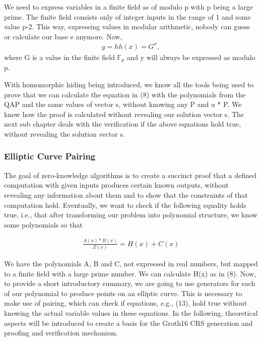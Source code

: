 We need to express variables in a finite field as of modulo p with p being a large prime. The finite field consists only of integer inputs in the range of 1 and some value p-2. This way, expressing values in modular arithmetic, nobody can guess or calculate our base e anymore. Now,
\begin{align}
    y = hh(x) = G^x,
\end{align}
where G is a value in the finite field \begin{math}\mathbb{F}_p\end{math} and y will always be expressed as modulo p.

With homomorphic hiding being introduced, we know all the tools being used to prove that we can calculate the equation in (8) with the polynomials from the QAP and the same values of vector s, without knowing any P and u * P. We know how the proof is calculated without revealing our solution vector s. The next sub chapter deals with the verification if the above equations hold true, without revealing the solution vector s.

\subsubsection{Elliptic Curve Pairing}

The goal of zero-knowledge algorithms is to create a succinct proof that a defined computation with given inputs produces certain known outputs, without revealing any information about them and to show that the constraints of that computation hold. Eventually, we want to check if the following equality holds true, i.e., that after transforming our problem into polynomial structure, we know some polynomials so that

\begin{align}
    \frac{A(x) * B(x)}{Z(x)} = H(x) + C(x)
\end{align}

We have the polynomials A, B and C, not expressed in real numbers, but mapped to a finite field with a large prime number. We can calculate H(x) as in (8). Now, to provide a short introductory summary, we are going to use generators for each of our polynomial to produce points on an elliptic curve. This is necessary to make use of pairing, which can check if equations, e.g., (13), hold true without knowing the actual variable values in these equations. In the following, theoretical aspects will be introduced to create a basis for the Groth16 CRS generation and proofing and verification mechanism.

